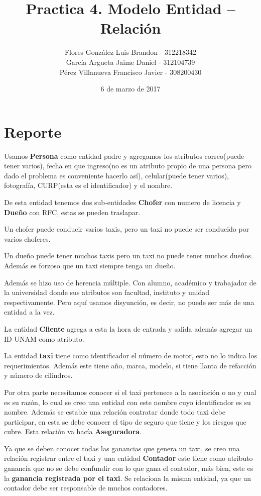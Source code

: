 \documentclass{article}
\author{Flores González Luis Brandon - 312218342 
	\\ García Argueta Jaime Daniel - 312104739
	\\ Pérez Villanueva Francisco Javier - 308200430}
\title{Practica 4. Modelo Entidad – Relación}
\date{6 de marzo de 2017}
\begin{document}
	\maketitle	
	
	\section{Reporte}
	
    Usamos \textbf{Persona} como entidad padre y agregamos los atributos correo(puede tener varios), fecha en que ingreso(no es un atributo propio de una persona pero dado el problema es conveniente hacerlo así), celular(puede tener varios), fotografía, CURP(esta es el identificador) y el nombre.
    
    De esta entidad tenemos dos sub-entidades \textbf{Chofer} con numero de licencia y \textbf{Dueño} con RFC, estas se pueden traslapar. 
    	
    Un chofer puede conducir varios taxis, pero un taxi no puede ser conducido por varios choferes.
    
    Un dueño puede tener muchos taxis pero un taxi no puede tener muchos dueños. Además es forzoso que un taxi siempre tenga un dueño.
    
    Además se hizo uso de herencia múltiple. Con alumno, académico y trabajador de la universidad donde sus atributos son facultad, instituto y unidad respectivamente. Pero aquí usamos disyunción, es decir, no puede ser más de una entidad a la vez. 
   
   	La entidad \textbf{Cliente} agrega a esta la hora de entrada y salida además agregar un ID UNAM como atributo.
    
    La entidad \textbf{taxi} tiene como identificador el número de motor, esto no lo indica los requerimientos. Además este tiene año, marca, modelo, si tiene llanta de refacción y número de cilindros.
    
    Por otra parte necesitamos conocer si el taxi pertenece a la asociación o no y cual es su razón, lo cual se creo una entidad con este nombre cuyo identificador es su nombre. Además se estable una relación contratar donde todo taxi debe participar, en esta se debe conocer el tipo de seguro que tiene y los riesgos que cubre.  Esta relación va hacía \textbf{Aseguradora}.
    	
	Ya que se deben conocer todas las ganancias que genera un taxi, se creo una relación registrar entre el taxi y una entidad \textbf{Contador} este tiene como atributo ganancia que no se debe confundir con lo que gana el contador, más bien, este es la \textbf{ganancia registrada por el taxi}. Se relaciona la misma entidad, ya que un contador debe ser responsable de muchos contadores.
	
\end{document}
